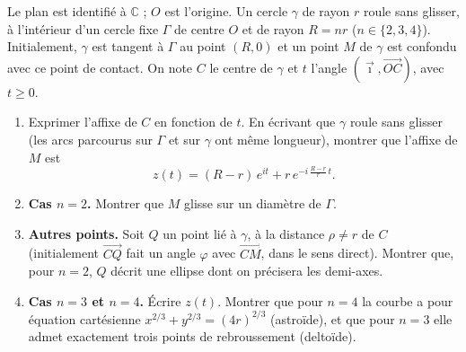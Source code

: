 
\newcommand{\C}{\mathbb{C}}

Le plan est identifié à $\C$ ; $O$ est l'origine. Un cercle $\gamma$ de rayon $r$ roule sans glisser, à l'intérieur d'un cercle fixe $\Gamma$ de centre $O$ et de rayon $R=nr$ ($n\in\{2,3,4\}$). Initialement, $\gamma$ est tangent à $\Gamma$ au point $(R,0)$ et un point $M$ de $\gamma$ est confondu avec ce point de contact. On note $C$ le centre de $\gamma$ et $t$ l'angle $\left(\vec{\imath},\overrightarrow{OC}\right)$, avec $t\geq0$.

\begin{center}
\end{center}

\begin{enumerate}
  \item Exprimer l'affixe de $C$ en fonction de $t$. En écrivant que $\gamma$ roule sans glisser (les arcs parcourus sur $\Gamma$ et sur $\gamma$ ont même longueur), montrer que l'affixe de $M$ est
  \[z(t)=(R-r)\,e^{it}+r\,e^{-i\,\frac{R-r}{r}\,t}.\]
  \item \textbf{Cas $n=2$.} Montrer que $M$ glisse sur un diamètre de $\Gamma$.
  \item \textbf{Autres points.} Soit $Q$ un point lié à $\gamma$, à la distance $\rho\neq r$ de $C$ (initialement $\overrightarrow{CQ}$ fait un angle $\varphi$ avec $\overrightarrow{CM}$, dans le sens direct). Montrer que, pour $n=2$, $Q$ décrit une ellipse dont on précisera les demi-axes.
  \item \textbf{Cas $n=3$ et $n=4$.} Écrire $z(t)$. Montrer que pour $n=4$ la courbe a pour équation cartésienne $x^{2/3}+y^{2/3}=(4r)^{2/3}$ (astroïde), et que pour $n=3$ elle admet exactement trois points de rebroussement (deltoïde).
\end{enumerate}

